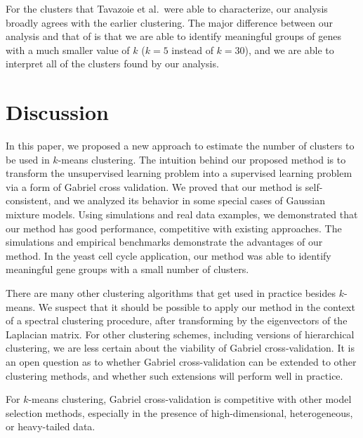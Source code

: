 \documentclass[12pt]{article}
\begin{document}
For the clusters that Tavazoie et al.\ were able to characterize, our analysis
broadly agrees with the earlier clustering. The major difference between our
analysis and that of \citet{tavazoie1999systematic} is that we are able to
identify meaningful groups of genes with a much smaller value of $k$ ($k = 5$
instead of $k = 30$), and we are able to interpret all of the clusters
found by our analysis.




\section{Discussion}
\label{sec:discussion}


In this paper, we proposed a new approach to estimate the number of clusters
to be used in $k$-means clustering. The intuition behind our proposed method
is to transform the unsupervised learning problem into a supervised learning
problem via a form of Gabriel cross validation.  We proved that our method is
self-consistent, and we analyzed its behavior in some special cases of
Gaussian mixture models.  Using simulations and real data examples, we
demonstrated that our method has good performance, competitive with existing
approaches. The simulations and empirical benchmarks demonstrate the
advantages of our method. In the yeast cell cycle application, our method
was able to identify meaningful gene groups with a small number of clusters.


There are many other clustering algorithms that get used in practice besides
$k$-means. We suspect that it should be possible to apply our method in the
context of a spectral clustering procedure, after transforming by the
eigenvectors of the Laplacian matrix. For other clustering schemes, including
versions of hierarchical clustering, we are less certain about the viability
of Gabriel cross-validation.  It is an open question as to whether Gabriel
cross-validation can be extended to other clustering methods, and whether such
extensions will perform well in practice.


For $k$-means clustering, Gabriel cross-validation is competitive with
other model selection methods, especially in the presence of high-dimensional,
heterogeneous, or heavy-tailed data.
\end{document}

